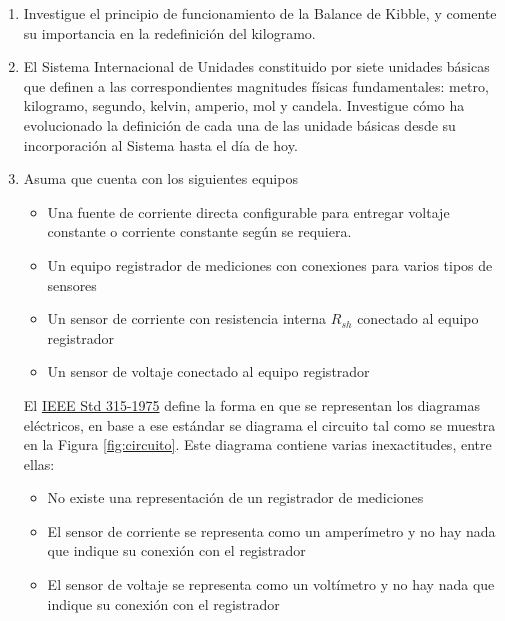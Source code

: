 \documentclass[12pt]{article}
\begin{document}
\setlength{\parindent}{0em}

\begin{enumerate}[label=(\Alph*)]

\item Investigue el principio de funcionamiento de la Balance de Kibble, y comente su importancia en la redefinición del kilogramo.

\item El Sistema Internacional de Unidades constituido por siete unidades básicas que definen a las correspondientes magnitudes físicas fundamentales: metro, kilogramo, segundo, kelvin, amperio, mol y candela. Investigue cómo ha evolucionado la definición de cada una de las unidade básicas desde su incorporación al Sistema hasta el día de hoy. 

\item Asuma que cuenta con los siguientes equipos
\begin{itemize}
    \item Una fuente de corriente directa configurable para entregar voltaje constante o corriente constante según se requiera. 
    \item Un equipo registrador de mediciones con conexiones para varios tipos de sensores
    \item Un sensor de corriente con resistencia interna $R_{sh}$ conectado al equipo registrador
    \item Un sensor de voltaje conectado al equipo registrador
\end{itemize}
El \href{https://www.ee.iitb.ac.in/~spilab/Tips/ansii_graphic_symbols_for_electrical_and_electronics_daigrams_1993.pdf}{IEEE Std 315-1975} define la forma en que se representan los diagramas eléctricos, en base a ese estándar se diagrama el circuito tal como se muestra en la Figura \ref{fig:circuito}. Este diagrama contiene varias inexactitudes, entre ellas:
\begin{itemize}
    \item No existe una representación de un registrador de mediciones
    \item El sensor de corriente se representa como un amperímetro y no hay nada que indique su conexión con el registrador
    \item El sensor de voltaje se representa como un voltímetro y no hay nada que indique su conexión con el registrador
\end{itemize}


\end{enumerate}
\end{document}
